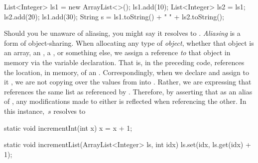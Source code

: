 
\begin{verbnobox}[\small]
List<Integer> ls1 = new ArrayList<>();
ls1.add(10);
List<Integer> ls2 = ls1;
ls2.add(20);
ls1.add(30);
String s = ls1.toString() + " " + ls2.toString();
\end{verbnobox}

Should you be unaware of aliasing, you might say it resolves to . 
\emph{Aliasing} is a form of object-sharing. 
When allocating any type of \emph{object}, whether that object is an array, an , a , or something else, we assign a reference \emph{to} that object in memory via the variable declaration. 
That is, in the preceding code,  references the location, in memory, of an . 
Correspondingly, when we declare  and assign to it , we are not copying over the values from  into .
Rather, we are expressing that  references the same list as referenced by . 
Therefore, by asserting that  as an alias of , any modifications made to either is reflected when referencing the other. 
In this instance,~$s$ resolves to 


\begin{verbnobox}[\small]
static void incrementInt(int x) {
  x = x + 1;
}

static void incrementList(ArrayList<Integer> ls, int idx) {
  ls.set(idx, ls.get(idx) + 1);
}
\end{verbnobox}

